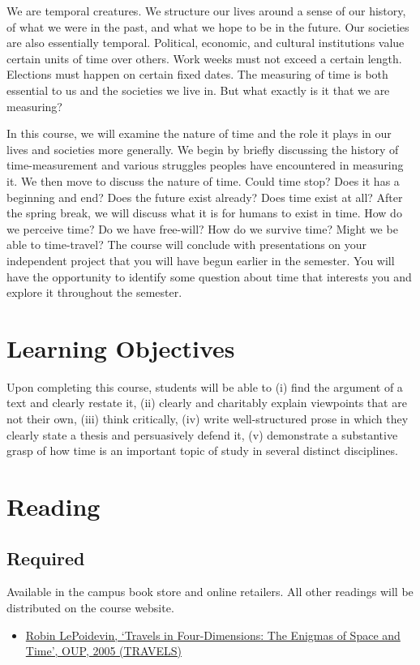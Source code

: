 \documentclass[article,oneside]{memoir}
\begin{document}
We are temporal creatures. We structure our lives around a sense of our history, of what we were in the past, and what we hope to be in the future. Our societies are also essentially temporal. Political, economic, and cultural institutions value certain units of time over others. Work weeks must not exceed a certain length. Elections must happen on certain fixed dates. The measuring of time is both essential to us and the societies we live in. But what exactly is it that we are measuring?

  In this course, we will examine the nature of time and the role it plays in our lives and societies more generally. We begin by briefly discussing the history of time-measurement and various struggles peoples have encountered in measuring it. We then move to discuss the nature of time. Could time stop? Does it has a beginning and end? Does the future exist already? Does time exist at all?  After the spring break, we will discuss what it is for humans to exist in time. How do we perceive time? Do we have free-will? How do we survive time? Might we be able to time-travel? The course will conclude with presentations on your independent project that you will have begun earlier in the semester. You will have the opportunity to identify some question about time that interests you and explore it throughout the semester.
  
   



\section{Learning Objectives}

Upon completing this course, students will be able to (i) find the argument of a text and clearly restate it, (ii) clearly and charitably explain viewpoints that are not their own, (iii) think critically, (iv) write well-structured prose in which they clearly state a thesis and persuasively defend it, (v) demonstrate a substantive grasp of how time is an  important topic of study in several distinct disciplines. 


\section{Reading}
\subsection{Required}
Available in the campus book store and online retailers. All other readings will be distributed on the course website. 
\begin{itemize}
\item \href{http://www.amazon.com/Travels-Four-Dimensions-Enigmas-Space/dp/0198752555/ref=sr_1_1?ie=UTF8&qid=1452098846&sr=8-1&keywords=robin+le+poidevin+enigmas}{Robin LePoidevin, `Travels in Four-Dimensions: The Enigmas of Space and Time', OUP, 2005 (TRAVELS)}
\end{itemize}
\end{document}
